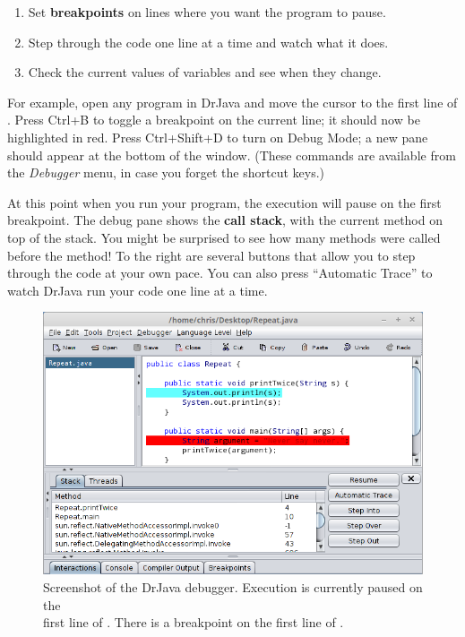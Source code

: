 \begin{enumerate}
\item Set {\bf breakpoints} on lines where you want the program to pause.
\item Step through the code one line at a time and watch what it does.
\item Check the current values of variables and see when they change.
\end{enumerate}

For example, open any program in DrJava and move the cursor to the first line of .
Press Ctrl+B to toggle a breakpoint on the current line; it should now be highlighted in red.
Press Ctrl+Shift+D to turn on Debug Mode; a new pane should appear at the bottom of the window.
(These commands are available from the {\em Debugger} menu, in case you forget the shortcut keys.)


At this point when you run your program, the execution will pause on the first breakpoint.
The debug pane shows the {\bf call stack}, with the current method on top of the stack.
You might be surprised to see how many methods were called before the  method!
To the right are several buttons that allow you to step through the code at your own pace.
You can also press ``Automatic Trace'' to watch DrJava run your code one line at a time.

\begin{figure}[!h]
\includegraphics[width=\textwidth]{debugger.png}
\caption{Screenshot of the DrJava debugger.
Execution is currently paused on the \\ first line of .
There is a breakpoint on the first line of .}
\end{figure}

